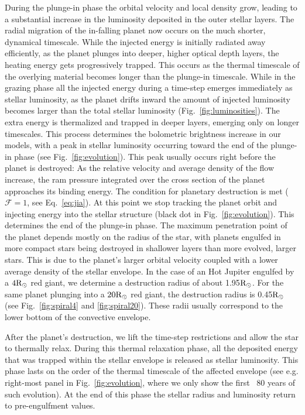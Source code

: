\documentclass[twocolumn]{aastex62}
\newcommand{\Rsun}{\ensuremath{{\rm R}_{\odot}}}
\begin{document}
During the plunge-in phase the orbital velocity and local density grow, leading to a substantial increase in the luminosity deposited in the outer stellar layers. The radial migration of the in-falling planet now occurs on the much shorter, dynamical timescale. 
While the injected energy is initially radiated away efficiently, as the planet plunges into deeper, higher optical depth layers, the heating energy gets progressively trapped. This occurs as the thermal timescale of the overlying material becomes longer than the plunge-in timescale.
While in the grazing phase all the injected energy during a time-step emerges immediately as stellar luminosity, as the planet drifts inward the amount of injected luminosity becomes larger than the total stellar luminosity (Fig.~\ref{fig:luminosities}). The extra energy is thermalized and trapped in deeper layers, emerging only on longer timescales. This process determines the bolometric brightness increase in our models, with a peak in stellar luminosity occurring toward the end of the plunge-in phase (see Fig.~\ref{fig:evolution}). This peak usually occurs right before the planet is destroyed: As the relative velocity and average density of the flow increase, the ram pressure integrated over the cross section of the planet approaches its binding energy. The condition for planetary destruction is met ($\mathcal{F} = 1$, see Eq.~\ref{eq:jia}). At this point we stop tracking the planet orbit and injecting energy into the stellar structure (black dot in Fig.~\ref{fig:evolution}). This determines the end of the plunge-in phase. The maximum penetration point of the planet depends mostly on the radius of the star, with planets engulfed in more compact stars being destroyed 
in shallower layers than more evolved, larger stars. This is due to the planet's larger orbital velocity coupled with a lower average density of the stellar envelope. In the case of an Hot Jupiter engulfed by a $4\Rsun$ red giant, we determine a destruction radius of about 1.95$\Rsun$. For the same planet plunging into a $20\Rsun$ red giant, the destruction radius is 0.45$\Rsun$ (see Fig.~\ref{fig:spiral4} and \ref{fig:spiral20}). These radii usually correspond to the lower bottom of the convective envelope. 

After the planet's destruction, we lift the time-step restrictions and allow the star to thermally relax. During this thermal relaxation phase,  all the deposited energy that was trapped within the stellar envelope is released as stellar luminosity. This phase lasts on the order of the thermal timescale of the affected envelope (see e.g. right-most panel in Fig.~\ref{fig:evolution}, where we only show the first ~80 years of such evolution). At the end of this phase the stellar radius and luminosity return to pre-engulfment values. 
\end{document}
